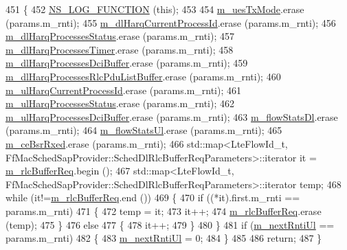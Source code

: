 \begin{DoxyCode}
451 \{
452   \hyperlink{log-macros-disabled_8h_a90b90d5bad1f39cb1b64923ea94c0761}{NS\_LOG\_FUNCTION} (\textcolor{keyword}{this});
453   
454   \hyperlink{classns3_1_1PssFfMacScheduler_a48aa1d9dc22e9c73e3c2206be76bb6cd}{m\_uesTxMode}.erase (params.m\_rnti);
455   \hyperlink{classns3_1_1PssFfMacScheduler_a860dc1e5d114893e493e5ff2696d7171}{m\_dlHarqCurrentProcessId}.erase (params.m\_rnti);
456   \hyperlink{classns3_1_1PssFfMacScheduler_aaddeb3fa864cb82b5829d4ca1cf9abea}{m\_dlHarqProcessesStatus}.erase  (params.m\_rnti);
457   \hyperlink{classns3_1_1PssFfMacScheduler_afcae17e3f08b0a6f1e1458a39da8cdcb}{m\_dlHarqProcessesTimer}.erase (params.m\_rnti);
458   \hyperlink{classns3_1_1PssFfMacScheduler_a167441dd2a0e5cde664eedfd19a07fbf}{m\_dlHarqProcessesDciBuffer}.erase  (params.m\_rnti);
459   \hyperlink{classns3_1_1PssFfMacScheduler_a0f31f16c2a9f067c6189462a9797e06b}{m\_dlHarqProcessesRlcPduListBuffer}.erase  (params.m\_rnti);
460   \hyperlink{classns3_1_1PssFfMacScheduler_a9e2a7c8f3e5e48aa429a5a06f4f70a72}{m\_ulHarqCurrentProcessId}.erase  (params.m\_rnti);
461   \hyperlink{classns3_1_1PssFfMacScheduler_a80badd341a079bd237ef7fe60db2cb79}{m\_ulHarqProcessesStatus}.erase  (params.m\_rnti);
462   \hyperlink{classns3_1_1PssFfMacScheduler_adfb2ba26a401807d40208e7b8f01f813}{m\_ulHarqProcessesDciBuffer}.erase  (params.m\_rnti);
463   \hyperlink{classns3_1_1PssFfMacScheduler_add144474dc7bd9d89b93ff14bc8d27c9}{m\_flowStatsDl}.erase  (params.m\_rnti);
464   \hyperlink{classns3_1_1PssFfMacScheduler_a352297bd379991aba26a724661058120}{m\_flowStatsUl}.erase  (params.m\_rnti);
465   \hyperlink{classns3_1_1PssFfMacScheduler_a7adb86186e0190e6b0aa66a562499268}{m\_ceBsrRxed}.erase (params.m\_rnti);
466   std::map<LteFlowId\_t, FfMacSchedSapProvider::SchedDlRlcBufferReqParameters>::iterator it = 
      \hyperlink{classns3_1_1PssFfMacScheduler_af66c823e9ee8ce17084dff35ce128191}{m\_rlcBufferReq}.begin ();
467   std::map<LteFlowId\_t, FfMacSchedSapProvider::SchedDlRlcBufferReqParameters>::iterator temp;
468   \textcolor{keywordflow}{while} (it!=\hyperlink{classns3_1_1PssFfMacScheduler_af66c823e9ee8ce17084dff35ce128191}{m\_rlcBufferReq}.end ())
469     \{
470       \textcolor{keywordflow}{if} ((*it).first.m\_rnti == params.m\_rnti)
471         \{
472           temp = it;
473           it++;
474           \hyperlink{classns3_1_1PssFfMacScheduler_af66c823e9ee8ce17084dff35ce128191}{m\_rlcBufferReq}.erase (temp);
475         \}
476       \textcolor{keywordflow}{else}
477         \{
478           it++;
479         \}
480     \}
481   \textcolor{keywordflow}{if} (\hyperlink{classns3_1_1PssFfMacScheduler_a9bbe57fde0c3046e43a686473b5e33ff}{m\_nextRntiUl} == params.m\_rnti)
482     \{
483       \hyperlink{classns3_1_1PssFfMacScheduler_a9bbe57fde0c3046e43a686473b5e33ff}{m\_nextRntiUl} = 0;
484     \}
485 
486   \textcolor{keywordflow}{return};
487 \}
\end{DoxyCode}


